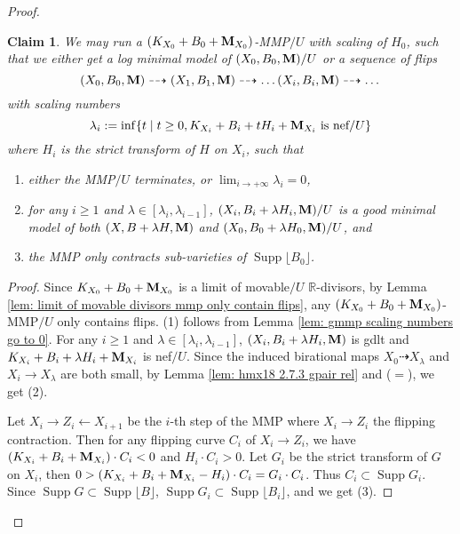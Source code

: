 \documentclass[11pt]{amsart}
\numberwithin{equation}{section}
\newcommand{\Mm}{{\bf{M}}}
\newcommand{\Rr}{\mathbb{R}}
\newcommand{\Supp}{\operatorname{Supp}}
\newtheorem{claim}[thm]{Claim}
\theoremstyle{definition}
\theoremstyle{definition}
\theoremstyle{definition}
\begin{document}
\begin{proof}
\begin{claim}\label{claim: has20a 3.3 rel gpair}
We may run a $(K_{X_0}+B_0+\Mm_{X_0})$-MMP$/U$ with scaling of $H_0$, such that we either get a log minimal model of $(X_0,B_0,\Mm)/U$ or a sequence of flips
$$(X_0,B_0,\Mm)\dashrightarrow (X_1,B_1,\Mm)\dashrightarrow\dots (X_i,B_i,\Mm)\dashrightarrow\dots$$
with scaling numbers 
$$\lambda_i:=\inf\{t\mid t\geq 0, K_{X_i}+B_i+tH_i+\Mm_{X_i}\text{ is nef}/U\}$$
where $H_i$ is the strict transform of $H$ on $X_i$, such that
\begin{enumerate}
    \item either the MMP$/U$ terminates, or $\lim_{i\rightarrow+\infty}\lambda_i=0$,
    \item for any $i\geq 1$ and $\lambda\in [\lambda_i,\lambda_{i-1}]$, $(X_i,B_i+\lambda H_i,\Mm)/U$ is a good minimal model of both $(X,B+\lambda H,\Mm)$ and $(X_0,B_0+\lambda H_0,\Mm)/U$, and
    \item the MMP only contracts sub-varieties of $\Supp\lfloor B_0\rfloor$.
\end{enumerate}
\end{claim}
\begin{proof}
Since $K_{X_0}+B_0+\Mm_{X_0}$ is a limit of movable$/U$ $\Rr$-divisors, by Lemma \ref{lem: limit of movable divisors mmp only contain flips}, any $(K_{X_0}+B_0+\Mm_{X_0})$-MMP$/U$ only contains flips. (1) follows from Lemma \ref{lem: gmmp scaling numbers go to 0}. For any $i\geq 1$ and $\lambda\in [\lambda_i,\lambda_{i-1}]$, $(X_i,B_i+\lambda H_i,\Mm)$ is gdlt and $K_{X_i}+B_i+\lambda H_i+\Mm_{X_i}$ is nef$/U$. Since the induced birational maps $X_0\dashrightarrow X_\lambda$ and $X_i\rightarrow X_\lambda$ are both small, by Lemma \ref{lem: hmx18 2.7.3 gpair rel} and \cite[Lemma 3.5(2)]{HL21} ($=$\cite[Version 3, Lemma 3.9(2)]{HL21}), we get (2).

Let $X_i\rightarrow Z_i\leftarrow X_{i+1}$ be the $i$-th step of the MMP where $X_i\rightarrow Z_i$ the flipping contraction. Then for any flipping curve $C_i$ of $X_i\rightarrow Z_i$, we have $(K_{X_i}+B_i+\Mm_{X_i})\cdot C_i<0$ and $H_i\cdot C_i>0$. Let $G_i$ be the strict transform of $G$ on $X_i$, then $0>(K_{X_i}+B_i+\Mm_{X_i}-H_i)\cdot C_i=G_i\cdot C_i$. Thus $C_i\subset\Supp G_i$. Since $\Supp G\subset\Supp\lfloor B\rfloor$, $\Supp G_i\subset\Supp\lfloor B_i\rfloor$, and we get (3).
\end{proof}


\end{proof}
\end{document}
